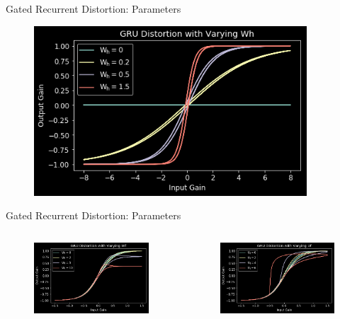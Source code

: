 \begin{frame}{Gated Recurrent Distortion: Parameters}
    \begin{figure}
        \centering
        \includegraphics[height=2.5in]{../GatedRecurrentDistortion/Pics/wh}
    \end{figure}
\end{frame}

\begin{frame}{Gated Recurrent Distortion: Parameters}
    \begin{columns}
        \begin{column}{0.5\linewidth}
            \begin{figure}
                \centering
                \includegraphics[width=2.75in]{../GatedRecurrentDistortion/Pics/wf}
            \end{figure}
        \end{column}
        \begin{column}{0.5\linewidth}
            \begin{figure}
                \centering
                \includegraphics[width=2.75in]{../GatedRecurrentDistortion/Pics/uf}
            \end{figure}
        \end{column}
    \end{columns}
\end{frame}

